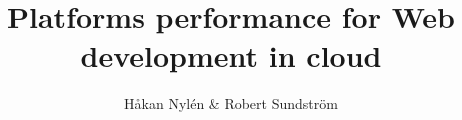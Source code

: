\documentclass{urithesis}
\begin{document}
\title{Platforms performance for Web development in cloud}

\author{Håkan Nylén & Robert Sundström}





\nocite{re:toolan:as03}
\end{document}
